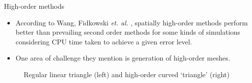 \documentclass[t,12pt]{beamer}
\begin{document}
\begin{frame}{High-order methods}
\begin{itemize}
  \item According to Wang, Fidkowski \emph{et. al.} , spatially high-order methods perform better than prevailing second order methods for some kinds of simulations considering CPU time taken to achieve a given error level.
  \item One area of challenge they mention is generation of high-order meshes.
\end{itemize}
\begin{figure}
		\centering
		\hspace{0.2in}
		\caption{Regular linear triangle (left) and high-order curved `triangle' (right)}
		\label{fig:curvedelement}
\end{figure}
\end{frame}
\end{document}
